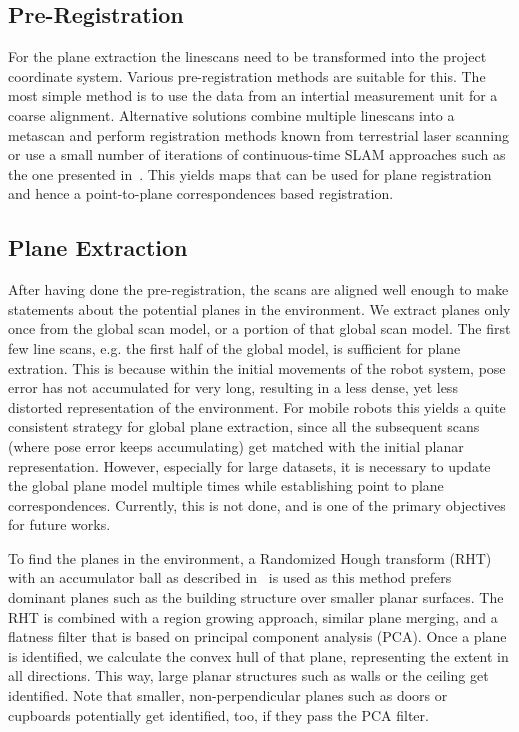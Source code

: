 \subsection{Pre-Registration}

For the plane extraction the linescans need to be transformed into the project coordinate system.
Various pre-registration methods are suitable for this.
The most simple method is to use the data from an intertial measurement unit for a coarse alignment.
Alternative solutions combine multiple linescans into a metascan and perform registration methods known from terrestrial laser scanning  or use a small number of iterations of continuous-time SLAM approaches such as the one presented in~\cite{REMSEN2013}.
This yields maps that can be used for plane registration and hence a point-to-plane correspondences based registration.

\subsection{Plane Extraction}

After having done the pre-registration, the scans are aligned well enough to make statements about the potential planes in the environment.
We extract planes only once from the global scan model, or a portion of that global scan model.
The first few line scans, e.g. the first half of the global model, is sufficient for plane extration.
This is because within the initial movements of the robot system, pose error has not accumulated for very long, resulting in a less dense, yet less distorted representation of the environment.
For mobile robots this yields a quite consistent strategy for global plane extraction, since all the subsequent scans (where pose error keeps accumulating) get matched with the initial planar representation.
However, especially for large datasets, it is necessary to update the global plane model multiple times while establishing point to plane correspondences.  
Currently, this is not done, and is one of the primary objectives for future works.

To find the planes in the environment, a Randomized Hough transform (RHT) with an accumulator ball as described in~\cite{3DRESEARCH2011} is used as this method prefers dominant planes such as the building structure over smaller planar surfaces.
The RHT is combined with a region growing approach, similar plane merging, and a flatness filter that is based on principal component analysis (PCA).
Once a plane is identified, we calculate the convex hull of that plane, representing the extent in all directions. 
This way, large planar structures such as walls or the ceiling get identified.
Note that smaller, non-perpendicular planes such as doors or cupboards potentially get identified, too, if they pass the PCA filter.

